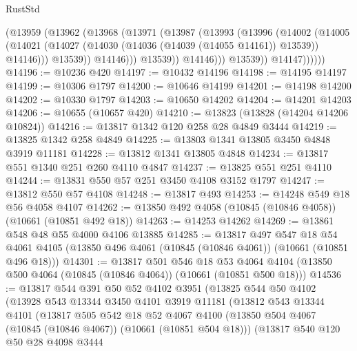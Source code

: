 \begin{lexlean}{RustStd}
\begin{coremodule}
                        (@13959
                          (@13962
                            (@13968
                              (@13971
                                (@13987
                                  (@13993
                                    (@13996
                                      (@14002
                                        (@14005
                                          (@14021
                                            (@14027
                                              (@14030 (@14036 (@14039 (@14055 @14161)) @13539))
                                              @14146)))
                                        @13539))
                                    @14146)))
                              @13539))
                          @14146)))
                    @13539))
                @14147))))))
@14196 := @10236 @420
@14197 := @10432 @14196
@14198 := @14195 @14197
@14199 := @10306 @1797
@14200 := @10646 @14199
@14201 := @14198 @14200
@14202 := @10330 @1797
@14203 := @10650 @14202
@14204 := @14201 @14203
@14206 := @10655 (@10657 @420)
@14210 := @13823 (@13828 (@14204 @14206 @10824))
@14216 := @13817 @1342 @120 @258 @28 @4849 @3444
@14219 := @13825 @1342 @258 @4849
@14225 := @13803 @1341 @13805 @3450 @4848 @3919 @11181
@14228 := @13812 @1341 @13805 @4848
@14234 := @13817 @551 @1340 @251 @260 @4110 @4847
@14237 := @13825 @551 @251 @4110
@14244 := @13831 @550 @57 @251 @3450 @4108 @3152 @1797
@14247 := @13812 @550 @57 @4108
@14248 := @13817 @493
@14253 := @14248 @549 @18 @56 @4058 @4107
@14262 := @13850 @492 @4058 (@10845 (@10846 @4058)) (@10661 (@10851 @492 @18))
@14263 := @14253 @14262
@14269 := @13861 @548 @48 @55 @4000 @4106 @13885
@14285 := @13817
    @497
    @547
    @18
    @54
    @4061
    @4105
    (@13850 @496 @4061 (@10845 (@10846 @4061)) (@10661 (@10851 @496 @18)))
@14301 := @13817
    @501
    @546
    @18
    @53
    @4064
    @4104
    (@13850 @500 @4064 (@10845 (@10846 @4064)) (@10661 (@10851 @500 @18)))
@14536 := @13817
    @544
    @391
    @50
    @52
    @4102
    @3951
    (@13825
      @544
      @50
      @4102
      (@13928
        @543
        @13344
        @3450
        @4101
        @3919
        @11181
        (@13812
          @543
          @13344
          @4101
          (@13817
            @505
            @542
            @18
            @52
            @4067
            @4100
            (@13850 @504 @4067 (@10845 (@10846 @4067)) (@10661 (@10851 @504 @18)))
            (@13817
              @540
              @120
              @50
              @28
              @4098
              @3444

\end{coremodule}
\end{lexlean}
